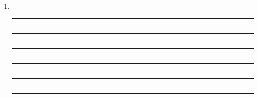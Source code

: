 \documentclass[a4paper,10pt]{article}
\begin{document}
\begin{enumerate}
\begin{enumerate}
\item~

\vspace{7mm}\hrule\vspace{7mm}\hrule\vspace{7mm}\hrule\vspace{7mm}\hrule
\vspace{7mm}\hrule\vspace{7mm}\hrule\vspace{7mm}\hrule\vspace{7mm}\hrule
\vspace{7mm}\hrule\vspace{7mm}\hrule\vspace{7mm}\hrule\vspace{3mm}

\end{enumerate}

\end{enumerate}
\end{document}
